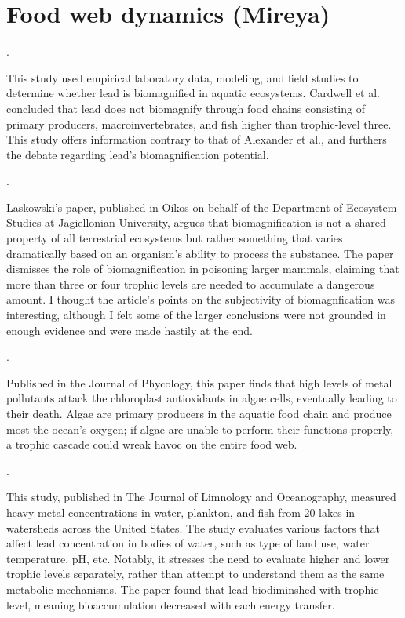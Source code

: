 \documentclass{article}
\begin{document}
\medskip

\section{Food web dynamics (Mireya)}

.

\bigskip

This study used empirical laboratory data, modeling, and field studies to determine whether lead is biomagnified in aquatic ecosystems. Cardwell et al. concluded that lead does not biomagnify through food chains consisting of primary producers, macroinvertebrates, and fish higher than trophic-level three. This study offers information contrary to that of Alexander et al., and furthers the debate regarding lead’s biomagnification potential. 

.

\bigskip

Laskowski’s paper, published in Oikos on behalf of the Department of Ecosystem Studies at Jagiellonian University, argues that biomagnification is not a shared property of all terrestrial ecosystems but rather something that varies dramatically based on an organism’s ability to process the substance.  The paper dismisses the role of biomagnification in poisoning larger mammals, claiming that more than three or four trophic levels are needed to accumulate a dangerous amount. I thought the article’s points on the subjectivity of biomagnfication was interesting, although I felt some of the larger conclusions were not grounded in enough evidence and were made hastily at the end. 

.

\bigskip

Published in the Journal of Phycology, this paper finds that high levels of metal pollutants attack the chloroplast antioxidants in algae cells, eventually leading to their death. Algae are primary producers in the aquatic food chain and produce most the ocean’s oxygen; if algae are unable to perform their functions properly, a trophic cascade could wreak havoc on the entire food web.  

\bigskip

.

\bigskip

This study, published in The Journal of Limnology and Oceanography, measured heavy metal concentrations in water, plankton, and fish from 20 lakes in watersheds across the United States. The study evaluates various factors that affect lead concentration in bodies of water, such as type of land use, water temperature, pH, etc. Notably, it stresses the need to evaluate higher and lower trophic levels separately, rather than attempt to understand them as the same metabolic mechanisms. The paper found that lead biodiminshed with trophic level, meaning bioaccumulation decreased with each energy transfer. 
\end{document}
